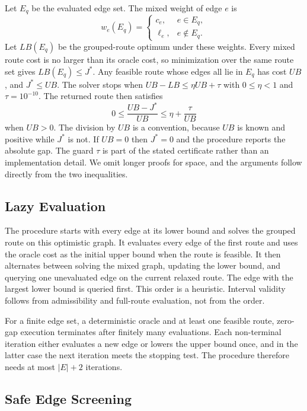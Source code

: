 \documentclass[conference]{IEEEtran}
\begin{document}
Let $E_q$ be the evaluated edge set. The mixed weight of edge $e$ is
\begin{equation}
w_e(E_q)=
\begin{cases}
c_e, & e\in E_q,\\
\ell_e, & e\notin E_q.
\end{cases}
\end{equation}
Let $LB(E_q)$ be the grouped-route optimum under these weights. Every mixed route cost is no larger than its oracle cost, so minimization over the same route set gives $LB(E_q)\le J^\ast$. Any feasible route whose edges all lie in $E_q$ has cost $UB$, and $J^\ast\le UB$. The solver stops when $UB-LB\le \eta UB+\tau$ with $0\le \eta<1$ and $\tau=10^{-10}$. The returned route then satisfies
\begin{equation}
0\le \frac{UB-J^\ast}{UB}\le \eta+\frac{\tau}{UB}
\end{equation}
when $UB>0$. The division by $UB$ is a convention, because $UB$ is known and positive while $J^\ast$ is not. If $UB=0$ then $J^\ast=0$ and the procedure reports the absolute gap. The guard $\tau$ is part of the stated certificate rather than an implementation detail. We omit longer proofs for space, and the arguments follow directly from the two inequalities.

\subsection{Lazy Evaluation}

The procedure starts with every edge at its lower bound and solves the grouped route on this optimistic graph. It evaluates every edge of the first route and uses the oracle cost as the initial upper bound when the route is feasible. It then alternates between solving the mixed graph, updating the lower bound, and querying one unevaluated edge on the current relaxed route. The edge with the largest lower bound is queried first. This order is a heuristic. Interval validity follows from admissibility and full-route evaluation, not from the order.

For a finite edge set, a deterministic oracle and at least one feasible route, zero-gap execution terminates after finitely many evaluations. Each non-terminal iteration either evaluates a new edge or lowers the upper bound once, and in the latter case the next iteration meets the stopping test. The procedure therefore needs at most $|E|+2$ iterations.

\subsection{Safe Edge Screening}
\end{document}
